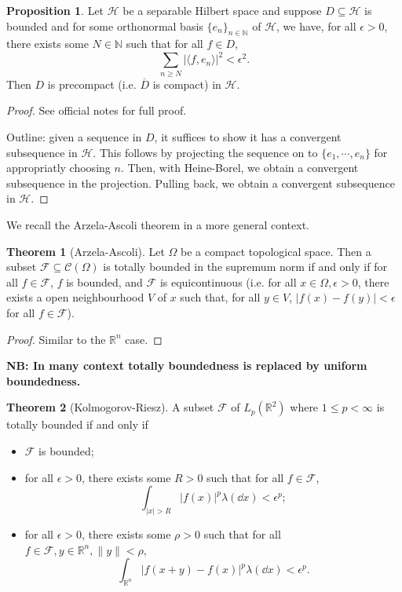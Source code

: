 \documentclass[]{article}
\theoremstyle{definition}
\newtheorem{theorem}{Theorem}
\theoremstyle{definition}
\newtheorem{proposition}{Proposition}[section]
\begin{document}
\begin{proposition}
  Let \(\mathcal{H}\) be a separable Hilbert space and suppose 
  \(D \subseteq \mathcal{H}\) is bounded and for some orthonormal basis 
  \(\{e_n\}_{n \in \mathbb{N}}\) of \(\mathcal{H}\), we have, for all 
  \(\epsilon > 0\), there exists some \(N \in \mathbb{N}\) such that 
  for all \(f \in D\),
  \[\sum_{n \ge N} |\langle f, e_n \rangle|^2 < \epsilon^2.\]
  Then \(D\) is precompact (i.e. \(\overline{D}\) is compact) in \(\mathcal{H}\).
\end{proposition}
\begin{proof}
  See official notes for full proof. 
  
  Outline: given a sequence in \(D\), it 
  suffices to show it has a convergent subsequence in \(\mathcal{H}\). This 
  follows by projecting the sequence on to \(\{e_1, \cdots, e_n\}\) for 
  appropriatly choosing \(n\). Then, with Heine-Borel, we obtain a 
  convergent subsequence in the projection. Pulling back, we obtain a 
  convergent subsequence in \(\mathcal{H}\).
\end{proof}

We recall the Arzela-Ascoli theorem in a more general context.

\begin{theorem}[Arzela-Ascoli]
  Let \(\Omega\) be a compact topological space. Then a subset 
  \(\mathcal{F} \subseteq \mathcal{C}(\Omega)\) is totally bounded in the 
  supremum norm if and only if for all \(f \in \mathcal{F}\), \(f\) is bounded, 
  and \(\mathcal{F}\) is equicontinuous 
  (i.e. for all \(x \in \Omega, \epsilon > 0\), there exists a open neighbourhood
  \(V\) of \(x\) such that, for all \(y \in V\), \(|f(x) - f(y)| < \epsilon\) 
  for all \(f \in \mathcal{F}\)).
\end{theorem}
\begin{proof}
  Similar to the \(\mathbb{R}^n\) case.
\end{proof}

\textbf{NB: In many context totally boundedness is replaced by uniform boundedness.}

\begin{theorem}[Kolmogorov-Riesz]
  A subset \(\mathcal{F}\) of \(L_p(\mathbb{R}^2)\) where \(1 \le p < \infty\) 
  is totally bounded if and only if 
  \begin{itemize}
    \item \(\mathcal{F}\) is bounded;
    \item for all \(\epsilon > 0\), there exists some \(R > 0\) such that for 
      all \(f \in \mathcal{F}\), 
      \[\int_{|x| > R} |f(x)|^p \lambda(\dd x) < \epsilon^p;\]
    \item for all \(\epsilon > 0\), there exists some \(\rho > 0\) such that 
      for all \(f \in \mathcal{F}, y \in \mathbb{R}^n, \|y\| < \rho\), 
      \[\int_{\mathbb{R}^n} |f(x + y) - f(x)|^p \lambda(\dd x) < \epsilon^p.\]
  \end{itemize}
\end{theorem}
\end{document}
